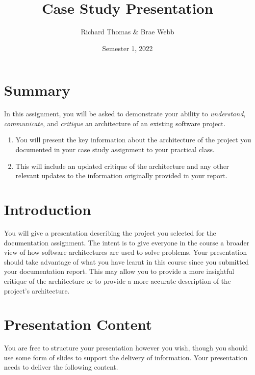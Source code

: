 \documentclass{csse4400}
\title{Case Study Presentation}
\author{Richard Thomas \& Brae Webb}
\date{Semester 1, 2022}
\begin{document}
\maketitle

\section*{Summary}
In this assignment, you will be asked to demonstrate your ability to
\textsl{understand}, \textsl{communicate}, and \textsl{critique} an architecture of an existing software project.
\begin{enumerate}
    \item You will present the key information about the architecture of the project you documented in your case study assignment to your practical class.
    \item This will include an updated critique of the architecture and any other relevant updates to the information originally provided in your report.
\end{enumerate}


\section{Introduction}
You will give a presentation describing the project you selected for the documentation assignment.
The intent is to give everyone in the course a broader view of how software architectures are used to solve problems.
Your presentation should take advantage of what you have learnt in this course since you submitted your documentation report.
This may allow you to provide a more insightful critique of the architecture or to provide a more accurate description of the project's architecture.


\section{Presentation Content}
You are free to structure your presentation however you wish, though you should use some form of slides to support the delivery of information.
Your presentation needs to deliver the following content.
\end{document}
